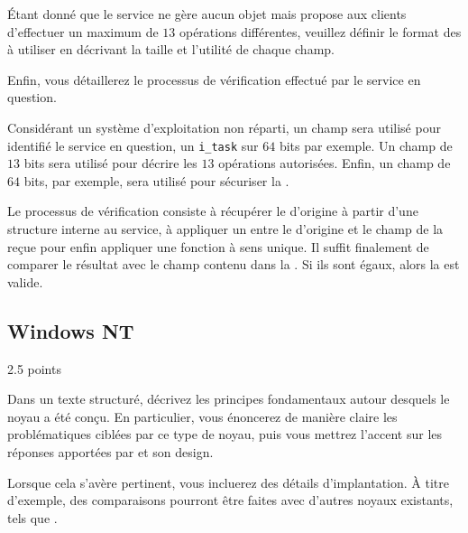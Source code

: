 \'Etant donn\'e que le service ne g\`ere aucun objet mais propose
aux clients d'effectuer un maximum de $13$ op\'erations diff\'erentes,
veuillez d\'efinir le format des  \`a utiliser en
d\'ecrivant la taille et l'utilit\'e de chaque champ.

Enfin, vous d\'etaillerez le processus de v\'erification effectu\'e
par le service en question.

\begin{correction}

Consid\'erant un syst\`eme d'exploitation non r\'eparti, un champ sera
utilis\'e pour identifi\'e le service en question, un \texttt{i\_task}
sur $64$ bits par exemple. Un champ de $13$ bits sera utilis\'e pour
d\'ecrire les $13$ op\'erations autoris\'ees. Enfin, un champ 
de $64$ bits, par exemple, sera utilis\'e pour s\'ecuriser la
.

Le processus de v\'erification consiste \`a r\'ecup\'erer le 
d'origine \`a partir d'une structure interne au service, \`a appliquer un
 entre le  d'origine et le champ 
de la  re\c{c}ue pour enfin appliquer une fonction
\`a sens unique. Il suffit finalement de comparer le r\'esultat avec le
champ  contenu dans la . Si ils sont
\'egaux, alors la  est valide.

\end{correction}

%
%
\subsection{Windows NT}
{\hfill{} \scriptsize{2.5 points}}

Dans un texte structur\'e, d\'ecrivez les principes fondamentaux autour
desquels le noyau  a \'et\'e con\c{c}u. En particulier, vous
\'enoncerez de mani\`ere claire les probl\'ematiques cibl\'ees par ce type de
noyau, puis vous mettrez l'accent sur les r\'eponses apport\'ees par 
et son design.

Lorsque cela s'av\`ere pertinent, vous incluerez des d\'etails d'implantation.
\`A titre d'exemple, des comparaisons pourront \^etre faites avec d'autres
noyaux existants, tels que .

